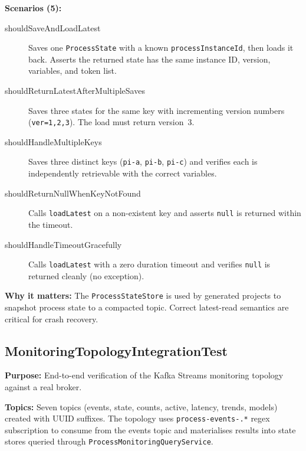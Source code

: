 \textbf{Scenarios (5):}

\begin{description}

\item[shouldSaveAndLoadLatest] Saves one \texttt{ProcessState} with a known
\texttt{processInstanceId}, then loads it back. Asserts the returned state
has the same instance ID, version, variables, and token list.

\item[shouldReturnLatestAfterMultipleSaves] Saves three states for the same
key with incrementing version numbers (\texttt{ver=1,2,3}). The load
must return version~3.

\item[shouldHandleMultipleKeys] Saves three distinct keys
(\texttt{pi-a}, \texttt{pi-b}, \texttt{pi-c}) and verifies each is
independently retrievable with the correct variables.

\item[shouldReturnNullWhenKeyNotFound] Calls \texttt{loadLatest} on a
non-existent key and asserts \texttt{null} is returned within the timeout.

\item[shouldHandleTimeoutGracefully] Calls \texttt{loadLatest} with a zero
duration timeout and verifies \texttt{null} is returned cleanly (no exception).

\end{description}

\textbf{Why it matters:} The \texttt{ProcessStateStore} is used by generated
projects to snapshot process state to a compacted topic. Correct
latest-read semantics are critical for crash recovery.


\subsection{MonitoringTopologyIntegrationTest}
\label{it:monitoringTopology}

\textbf{Purpose:} End-to-end verification of the Kafka Streams monitoring
topology against a real broker.

\textbf{Topics:} Seven topics (events, state, counts, active, latency,
trends, models) created with UUID suffixes. The topology uses
\texttt{process-events-.*} regex subscription to consume from the events
topic and materialises results into state stores queried through
\texttt{ProcessMonitoringQueryService}.

